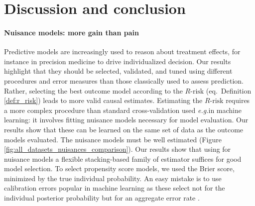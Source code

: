 \documentclass[unnumsec,webpdf,contemporary,large]{oup-authoring-template}%
\theoremstyle{thmstyleone}%
\theoremstyle{thmstyletwo}%
\theoremstyle{thmstylethree}%
\newcommand{\eg}{\emph{e.g.}}
\begin{document}
\section{Discussion and conclusion}\label{sec:discussion}\label{sec:conclusion}


\paragraph{Nuisance models: more gain than pain}
%
Predictive models are increasingly used to reason about treatment effects, for
instance in precision medicine to drive individualized decision. Our results
highlight that they should be selected, validated, and tuned using different
procedures and error measures than those classically used to assess prediction. Rather, selecting the best outcome
model according to the $R\text{-risk}$ (eq.\, Definition \ref{def:r_risk}) leads
to more valid causal estimates. Estimating the $R\text{-risk}$ requires a more
complex procedure than standard cross-validation used \eg in machine
learning: it involves fitting nuisance models necessary for model
evaluation.
Our results show that these can be learned on the same set of data as the
outcome models evaluated. The nuisance models must be well estimated (Figure
\ref{fig:all_datasets_nuisances_comparison}). Our results show that using for
nuisance models a flexible stacking-based family of estimator suffices for good
model selection. To select propensity score models, we used the Brier score,
minimized by the true individual probability. An easy mistake is to
use calibration errors popular in machine learning
\cite{platt_probabilistic_1999,zadrozny_obtaining_2001,niculescu-mizil_predicting_2005,minderer_revisiting_2021}
as these select not for the individual posterior probability but for an
aggregate error rate \cite{perez2022beyond}.


%
\end{document}
